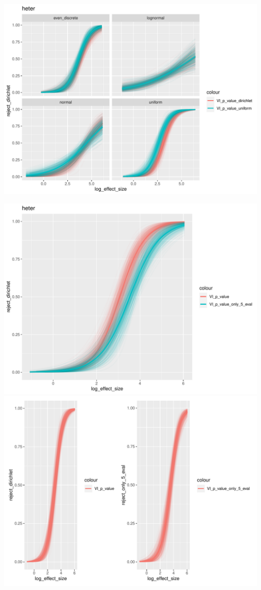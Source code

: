 \documentclass[]{interact}
\theoremstyle{plain}%
\theoremstyle{definition}
\theoremstyle{remark}
\begin{document}
\includegraphics[width=1\linewidth]{paper_comparison_files/figure-latex/unnamed-chunk-12-1}

\includegraphics[width=1\linewidth]{paper_comparison_files/figure-latex/unnamed-chunk-13-1}
\includegraphics[width=1\linewidth]{paper_comparison_files/figure-latex/unnamed-chunk-13-2}
\end{document}
